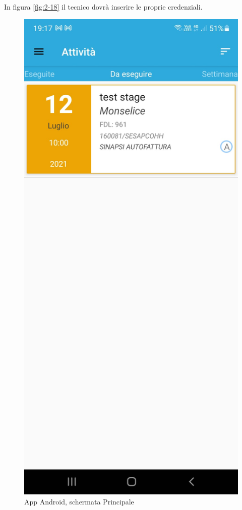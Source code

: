 In figura \ref{fig:2-18} il tecnico dovrà inserire le proprie credenziali.\\
\newpage
\begin{figure}[!h] 
	\centering 
	\includegraphics[scale = 0.11]{immagini/app Android/elenco-interventi-android.jpeg} 
	\caption {App Android, schermata Principale}
	\label{fig:2-19}
\end{figure}
